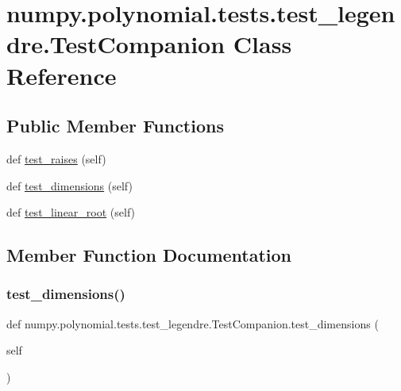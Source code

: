 \hypertarget{classnumpy_1_1polynomial_1_1tests_1_1test__legendre_1_1TestCompanion}{}\section{numpy.\+polynomial.\+tests.\+test\+\_\+legendre.\+Test\+Companion Class Reference}
\label{classnumpy_1_1polynomial_1_1tests_1_1test__legendre_1_1TestCompanion}
\subsection*{Public Member Functions}
\begin{DoxyCompactItemize}
\item 
def \hyperlink{classnumpy_1_1polynomial_1_1tests_1_1test__legendre_1_1TestCompanion_a11ed390f9398c867e291e474c16ae6f5}{test\+\_\+raises} (self)
\item 
def \hyperlink{classnumpy_1_1polynomial_1_1tests_1_1test__legendre_1_1TestCompanion_a776e054c80313307372906ee9d2fc1d7}{test\+\_\+dimensions} (self)
\item 
def \hyperlink{classnumpy_1_1polynomial_1_1tests_1_1test__legendre_1_1TestCompanion_a432bd114403efdb6919faefe39db940b}{test\+\_\+linear\+\_\+root} (self)
\end{DoxyCompactItemize}


\subsection{Member Function Documentation}
\mbox{\label{classnumpy_1_1polynomial_1_1tests_1_1test__legendre_1_1TestCompanion_a776e054c80313307372906ee9d2fc1d7}} 
\subsubsection{\texorpdfstring{test\+\_\+dimensions()}{test\_dimensions()}}
{\footnotesize\ttfamily def numpy.\+polynomial.\+tests.\+test\+\_\+legendre.\+Test\+Companion.\+test\+\_\+dimensions (\begin{DoxyParamCaption}\item[{}]{self }\end{DoxyParamCaption})}

